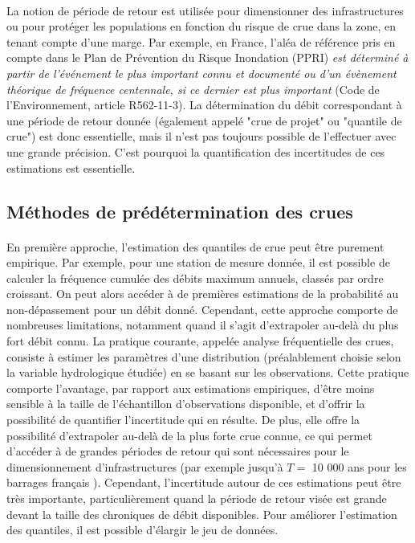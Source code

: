 	\paragraph{} La notion de période de retour est utilisée pour dimensionner des infrastructures ou pour protéger les populations en fonction du risque de crue dans la zone, en tenant compte d'une marge. Par exemple, en France, l'aléa de référence pris en compte dans le Plan de Prévention du Risque Inondation (PPRI) \og \textit{est déterminé à partir de l'événement le plus important connu et documenté ou d'un évènement théorique de fréquence centennale, si ce dernier est plus important}\fg{} (Code de l'Environnement, article R562-11-3). La détermination du débit correspondant à une période de retour donnée (également appelé "crue de projet" ou "quantile de crue") est donc essentielle, mais il n'est pas toujours possible de l'effectuer avec une grande précision. C'est pourquoi la quantification des incertitudes de ces estimations est essentielle.
	
	\subsection*{Méthodes de prédétermination des crues}
	\label{subsec:méthodes}	
	
	\paragraph{} En première approche, l'estimation des quantiles de crue peut être purement empirique. Par exemple, pour une station de mesure donnée, il est possible de calculer la fréquence cumulée des débits maximum annuels, classés par ordre croissant. On peut alors accéder à de premières estimations de la probabilité au non-dépassement pour un débit donné. Cependant, cette approche comporte de nombreuses limitations, notamment quand il s'agit d'extrapoler au-delà du plus fort débit connu. La pratique courante, appelée analyse fréquentielle des crues, consiste à estimer les paramètres d'une distribution (préalablement choisie selon la variable hydrologique étudiée) en se basant sur les observations. Cette pratique comporte l'avantage, par rapport aux estimations empiriques, d'être moins sensible à la taille de l'échantillon d'observations disponible, et d'offrir la possibilité de quantifier l'incertitude qui en résulte. De plus, elle offre la possibilité d'extrapoler au-delà de la plus forte crue connue, ce qui permet d'accéder à de grandes périodes de retour qui sont nécessaires pour le dimensionnement d'infrastructures (par exemple jusqu'à $T =$ 10 000 ans pour les barrages français \citep{le_delliou_recommandations_2014}). Cependant, l'incertitude autour de ces estimations peut être très importante, particulièrement quand la période de retour visée est grande devant la taille des chroniques de débit disponibles. Pour améliorer l'estimation des quantiles, il est possible d'élargir le jeu de données. 
	
